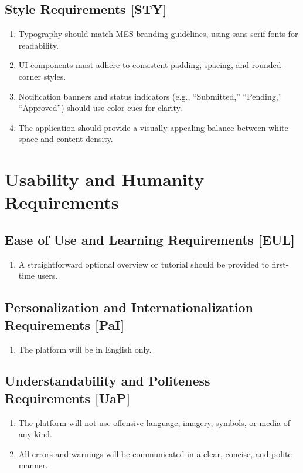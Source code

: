 \documentclass[12pt]{article}
\begin{document}
\begin{enumerate}
    \subsection{Style Requirements [STY]}
    \begin{enumerate}
        \item Typography should match MES branding guidelines, using sans-serif fonts for readability.
        \item UI components must adhere to consistent padding, spacing, and rounded-corner styles.
        \item Notification banners and status indicators (e.g., “Submitted,” “Pending,” “Approved”) should use color cues for clarity.
        \item The application should provide a visually appealing balance between white space and content density.
    \end{enumerate}
\section{Usability and Humanity Requirements}
  \subsection{Ease of Use and Learning Requirements [EUL]}
    \begin{enumerate}
      \item A straightforward optional overview or tutorial should be provided to first-time users.
    \end{enumerate}

  \subsection{Personalization and Internationalization Requirements [PaI]}
    \begin{enumerate}
      \item The platform will be in English only.
    \end{enumerate}

  \subsection{Understandability and Politeness Requirements [UaP]}
    \begin{enumerate}
      \item The platform will not use offensive language, imagery, symbols, or media of any kind.
      \item All errors and warnings will be communicated in a clear, concise, and polite manner.
    \end{enumerate}


\end{enumerate}
\end{document}
